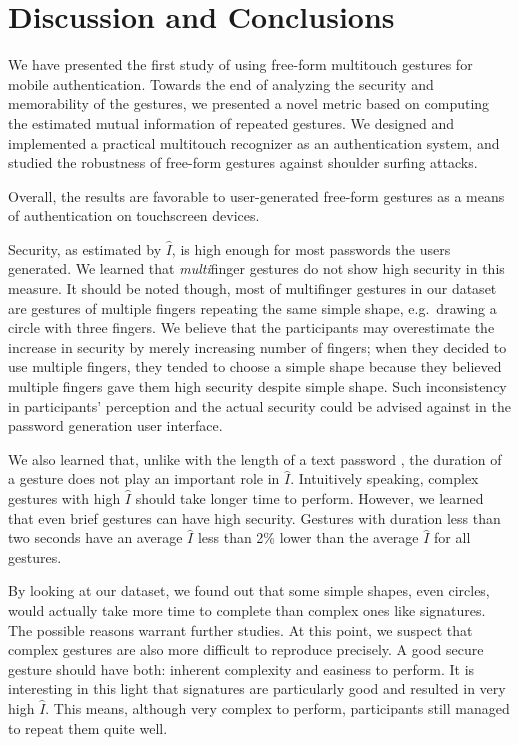 \documentclass{sig-alternate-10pt}
\begin{document}
\section{Discussion and Conclusions}

We have presented the first study of using free-form multitouch gestures
for mobile authentication. Towards the end of analyzing the security and memorability
of the gestures, we presented a novel metric based on computing the estimated
mutual information of repeated gestures. We designed and implemented a practical
multitouch recognizer as an authentication system, and studied the robustness of
free-form gestures against shoulder surfing attacks.

Overall, the results are favorable to user-generated free-form gestures as a means of authentication on touchscreen devices. 

Security, as estimated by $\hat{I}$, is high enough for most passwords the users generated. We learned that \emph{multi}finger gestures do not show high security in this measure. It should be noted though, most of multifinger gestures in our dataset are gestures of multiple fingers repeating the same simple shape, e.g.~drawing a circle with three fingers. We believe that the participants may overestimate the increase in security by merely increasing number of fingers; when they decided to use multiple fingers, they tended to choose a simple shape because they believed multiple fingers gave them high security despite simple shape. Such inconsistency in participants' perception and the actual security could be advised against in the password generation user interface. 

We also learned that, unlike with the length of a text password \cite{helpingusers}, the duration of a gesture does not play an important role in $\hat{I}$. Intuitively speaking, complex gestures with high $\hat{I}$ should take longer time to perform. However, we learned that even brief gestures can have high security. Gestures with duration less than two seconds have an average $\hat{I}$ less than 2\% lower than the average $\hat{I}$ for all gestures.

By looking at our dataset, we found out that some simple shapes, even circles, would actually take more time to complete than complex ones like signatures. The possible reasons warrant further studies. At this point, we suspect that complex gestures are also more difficult to reproduce precisely. A good secure gesture should have both: inherent complexity and easiness to perform. It is interesting in this light that signatures are particularly good and resulted in very high $\hat{I}$. This means, although very complex to perform, participants still managed to repeat them quite well. 
\end{document}
